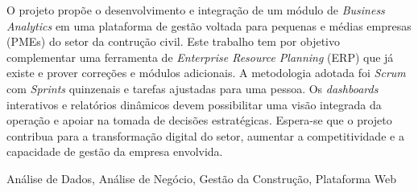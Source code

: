 
O projeto propõe o desenvolvimento e integração de um módulo de \textit{Business Analytics} em uma plataforma de gestão voltada para pequenas e médias empresas (PMEs) do setor da contrução civil. Este trabalho tem por objetivo complementar uma ferramenta de \textit{Enterprise Resource Planning} (ERP) que já existe e prover correções e módulos adicionais. A metodologia adotada foi \textit{Scrum} com \textit{Sprints} quinzenais e tarefas ajustadas para uma pessoa. Os \textit{dashboards} interativos e relatórios dinâmicos devem possibilitar uma visão integrada da operação e apoiar na tomada de decisões estratégicas. Espera-se que o projeto contribua para a transformação digital do setor, aumentar a competitividade e a capacidade de gestão da empresa envolvida.

\mbox{}\linebreak
{} Análise de Dados, Análise de Negócio, Gestão da Construção, Plataforma Web

